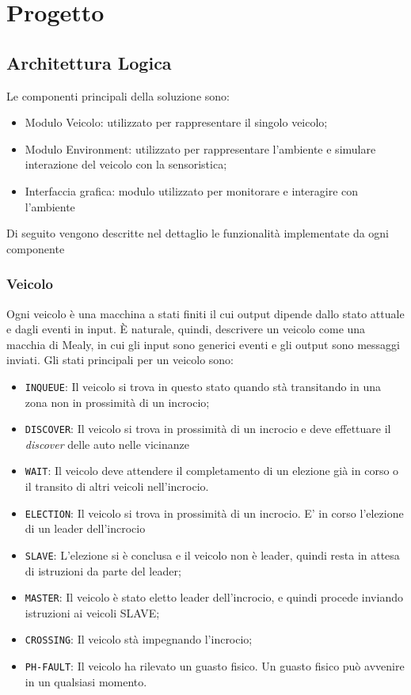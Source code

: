 \documentclass{memoir}
\begin{document}
\chapter{Progetto}

\section{Architettura Logica}
Le componenti principali della soluzione sono:
\begin{itemize}
\item Modulo Veicolo: utilizzato per rappresentare il singolo veicolo;
\item Modulo Environment: utilizzato per rappresentare l'ambiente e simulare
  interazione del veicolo con la sensoristica;
\item Interfaccia grafica: modulo utilizzato per monitorare e interagire con l'ambiente
\end{itemize}

Di seguito vengono descritte nel dettaglio le funzionalità implementate da ogni componente
\subsection{Veicolo}
Ogni veicolo è una macchina a stati finiti il cui output dipende dallo stato
attuale e dagli eventi in input. È naturale, quindi, descrivere un veicolo come
una macchia di Mealy, in cui gli input sono generici eventi e gli output sono
messaggi inviati. Gli stati principali per un veicolo sono:
\begin{itemize}
\item \texttt{INQUEUE}: Il veicolo si trova in questo stato quando stà
  transitando in una zona non in prossimità di un incrocio;
\item \texttt{DISCOVER}: Il veicolo si trova in prossimità di un incrocio e deve
  effettuare il \emph{discover} delle auto nelle vicinanze
\item \texttt{WAIT}: Il veicolo deve attendere il completamento di un elezione
  già in corso o il transito di altri veicoli nell'incrocio.
\item \texttt{ELECTION}: Il veicolo si trova in prossimità di un incrocio. E' in
  corso l'elezione di un leader dell'incrocio
\item \texttt{SLAVE}: L'elezione si è conclusa e il veicolo non è leader, quindi
  resta in attesa di istruzioni da parte del leader;
\item \texttt{MASTER}: Il veicolo è stato eletto leader dell'incrocio, e quindi
  procede inviando istruzioni ai veicoli SLAVE;
\item \texttt{CROSSING}: Il veicolo stà impegnando l'incrocio;
\item \texttt{PH-FAULT}: Il veicolo ha rilevato un guasto fisico. Un guasto
  fisico può avvenire in un qualsiasi momento.
\end{itemize}
\end{document}
